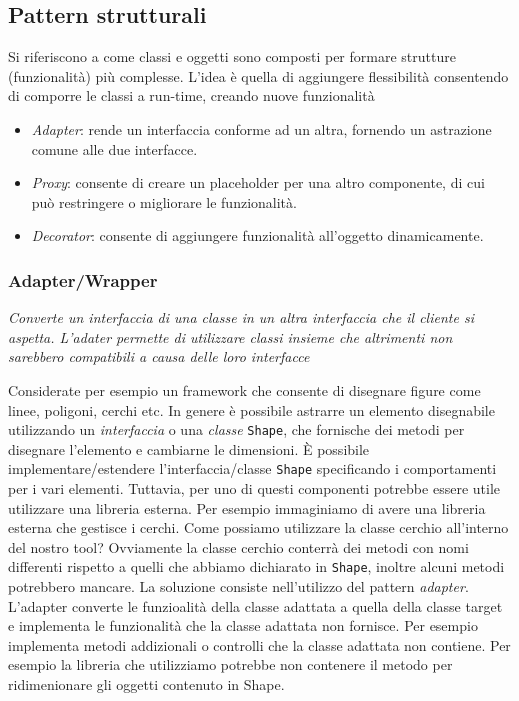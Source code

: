 \documentclass{article}
\begin{document}
\subsection{Pattern strutturali}

Si riferiscono a come classi e oggetti sono composti per formare strutture (funzionalit\`a) pi\`u complesse. L'idea \`e quella di aggiungere flessibilit\`a consentendo di comporre le classi a run-time, creando nuove funzionalit\`a

\begin{itemize}
\item \emph{Adapter}: rende un interfaccia conforme ad un altra, fornendo un astrazione comune alle due interfacce. 
\item \emph{Proxy}: consente di creare un placeholder per una altro componente, di cui pu\`o restringere o migliorare le funzionalit\`a.
\item \emph{Decorator}: consente di aggiungere funzionalit\`a all'oggetto dinamicamente.
\end{itemize}






\subsubsection{Adapter/Wrapper}
\begin{framed}
\emph{Converte un interfaccia di una classe in un altra interfaccia che il cliente si aspetta. L'adater permette di utilizzare classi insieme che altrimenti non sarebbero compatibili a causa delle loro interfacce}
\end{framed}


Considerate per esempio un framework che consente di disegnare figure come linee, poligoni, cerchi etc. In genere \`e possibile astrarre un elemento disegnabile utilizzando un \emph{interfaccia} o una \emph{classe} \texttt{Shape}, che fornische dei metodi per disegnare l'elemento e cambiarne le dimensioni. \`E possibile implementare/estendere l'interfaccia/classe \texttt{Shape} specificando i comportamenti per i vari elementi. Tuttavia, per uno di questi componenti potrebbe essere utile utilizzare una libreria esterna. Per esempio immaginiamo di avere una libreria esterna che gestisce i cerchi. Come possiamo utilizzare la classe cerchio all'interno del nostro tool? Ovviamente la classe cerchio conterr\`a dei metodi con nomi differenti rispetto a quelli che abbiamo dichiarato in \texttt{Shape}, inoltre alcuni metodi potrebbero mancare. La soluzione consiste nell'utilizzo del pattern \emph{adapter}. L'adapter converte le funzioalit\`a della classe adattata a quella della classe target e implementa le funzionalit\`a che la classe adattata non fornisce. Per esempio implementa metodi addizionali o controlli che la classe adattata non contiene. Per esempio la libreria che utilizziamo potrebbe non contenere il metodo per ridimenionare gli oggetti contenuto in Shape.
\end{document}
